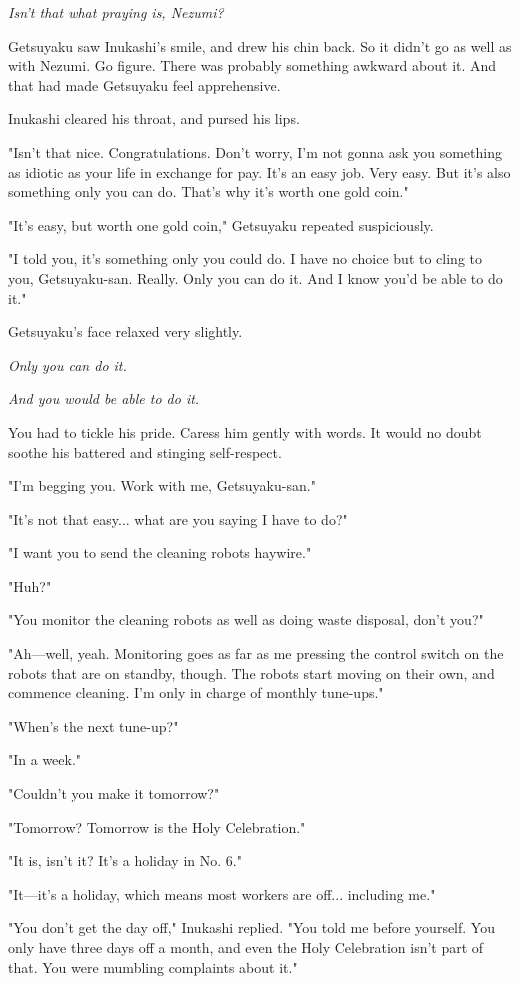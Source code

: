 \emph{Isn't that what praying is, Nezumi?}

Getsuyaku saw Inukashi's smile, and drew his chin back. So it didn't go
as well as with Nezumi. Go figure. There was probably something awkward
about it. And that had made Getsuyaku feel apprehensive.

Inukashi cleared his throat, and pursed his lips.

"Isn't that nice. Congratulations. Don't worry, I'm not gonna ask you
something as idiotic as your life in exchange for pay. It's an easy job.
Very easy. But it's also something only you can do. That's why it's
worth one gold coin."

"It's easy, but worth one gold coin," Getsuyaku repeated suspiciously.

"I told you, it's something only you could do. I have no choice but to
cling to you, Getsuyaku-san. Really. Only you can do it. And I know
you'd be able to do it."

Getsuyaku's face relaxed very slightly.

\emph{Only you can do it.}

\emph{And you \emph{would} be able to do it.}

You had to tickle his pride. Caress him gently with words. It would no
doubt soothe his battered and stinging self-respect.

"I'm begging you. Work with me, Getsuyaku-san."

"It's not that easy... what are you saying I have to do?"

"I want you to send the cleaning robots haywire."

"Huh?"

"You monitor the cleaning robots as well as doing waste disposal, don't
you?"

"Ah---well, yeah. Monitoring goes as far as me pressing the control switch
on the robots that are on standby, though. The robots start moving on
their own, and commence cleaning. I'm only in charge of monthly
tune-ups."

"When's the next tune-up?"

"In a week."

"Couldn't you make it tomorrow?"

"Tomorrow? Tomorrow is the Holy Celebration."

"It is, isn't it? It's a holiday in No. 6."

"It---it's a holiday, which means most workers are off... including me."

"You don't get the day off," Inukashi replied. "You told me before
yourself. You only have three days off a month, and even the Holy
Celebration isn't part of that. You were mumbling complaints about it."

